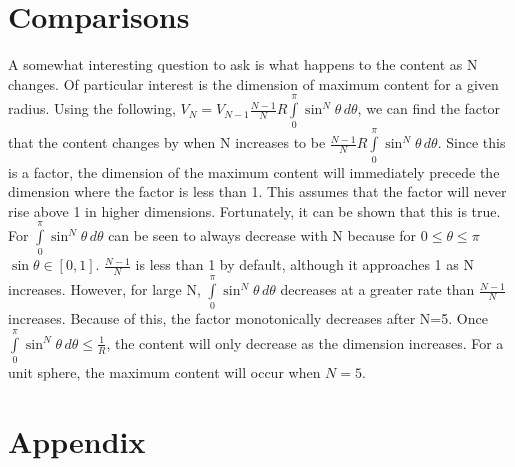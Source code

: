 \documentclass [letterpaper]{article}
\begin{document}
\section{Comparisons}
A somewhat interesting question to ask is what happens to the content as N changes. Of particular interest is the dimension of maximum content for a given radius. Using the following, $V_N=V_{N-1}\frac{N-1}{N}R\int\limits_0^\pi\sin^N\theta\,d\theta$, we can find the factor that the content changes by when N increases to be $\frac{N-1}{N}R\int\limits_0^\pi\sin^N\theta\,d\theta$. Since this is a factor, the dimension of the maximum content will immediately precede the dimension where the factor is less than 1. This assumes that the factor will never rise above 1 in higher dimensions. Fortunately, it can be shown that this is true. For $\int\limits_0^\pi\sin^N\theta\,d\theta$ can be seen to always decrease with N because for $0\le\theta\le\pi$ $\sin\theta\in[0, 1]$. $\frac{N-1}{N}$ is less than 1 by default, although it approaches 1 as N increases. However, for large N, $\int\limits_0^\pi\sin^N\theta\,d\theta$ decreases at a greater rate than $\frac{N-1}{N}$ increases. Because of this, the factor monotonically decreases after N=5. Once $\int\limits_0^\pi\sin^N\theta\,d\theta\le\frac{1}{R}$, the content will only decrease as the dimension increases.
For a unit sphere, the  maximum content will occur when $N=5$.
\renewcommand{\thesection}{A}
\section{Appendix}
\end{document}
